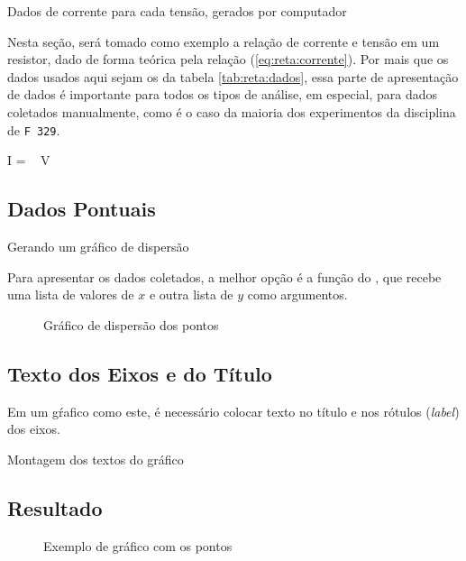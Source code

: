 \begin{table}[H]
    \centering
    
    \caption{Dados de corrente para cada tensão, gerados por computador}
    \label{tab:reta:dados}
\end{table}

Nesta seção, será tomado como exemplo a relação de corrente e tensão em um resistor, dado de forma teórica pela relação (\ref{eq:reta:corrente}). Por mais que os dados usados aqui sejam os da tabela \ref{tab:reta:dados}, essa parte de apresentação de dados é importante para todos os tipos de análise, em especial, para dados coletados manualmente, como é o caso da maioria dos experimentos da disciplina de \texttt{F 329}.

\begin{equacao} \label{eq:reta:corrente}
    I =  ~ V
\end{equacao}


\subsection{Dados Pontuais}

    \begin{listing}[H]
        \caption{Gerando um gráfico de dispersão}
        \label{code:reta:scatter}

    \end{listing}

    Para apresentar os dados coletados, a melhor opção é a função \href{https://matplotlib.org/3.1.0/api/_as_gen/matplotlib.pyplot.scatter.html}{} do \pyplot, que recebe uma lista de valores de $x$ e outra lista de $y$ como argumentos.

    \begin{figure}[htbp]
        \centering
        

        \caption{Gráfico de dispersão dos pontos}
        \label{fig:reta:dados}
    \end{figure}


\subsection{Texto dos Eixos e do Título}

    Em um gŕafico como este, é necessário colocar texto no título e nos rótulos (\textit{label}) dos eixos.

    \begin{listing}[H]
        \caption{Montagem dos textos do gráfico}
        \label{code:reta:textos}

    \end{listing}


\subsection{Resultado}

    \begin{figure}[htbp]
        \centering
        

        \caption{Exemplo de gráfico com os pontos}
        \label{fig:reta:resultado}
    \end{figure}
